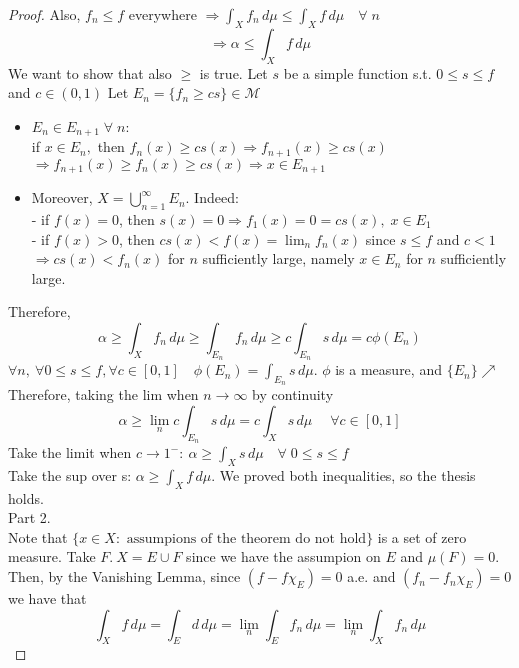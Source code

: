 \begin{proof}
    Also, \(f_n \leq f \) everywhere \(\Rightarrow \int_X f_n \, d\mu \leq \int_X f \, d\mu \quad \forall \; n\) 
    \[
        \Rightarrow \alpha \leq \int_X f \, d\mu 
    \]
    We want to show that also \(\geq \) is true. Let \(s\) be a simple function s.t. \(0 \leq s \leq f\) and \(c \in \left(0,1\right)\)
    Let \(E_n = \{f_n \geq cs\} \in \mathcal{M}\)
    \begin{itemize}
        \item \(E_n \in E_{n+1} \; \forall \; n:\) 
        \\ if \(x \in E_n, \) then \(f_n(x) \geq cs(x) \Rightarrow f_{n+1}(x) \geq cs(x)\) \\ \(\Rightarrow f_{n+1}(x) \geq f_n(x) \geq cs(x) \Rightarrow x \in E_{n+1}\)
        \item Moreover, \(X = \bigcup_{n=1}^\infty E_n\). Indeed: 
        \\ - if \(f(x)=0\), then \(s(x)=0 \Rightarrow f_1(x)=0 = cs(x), \; x \in E_1\) 
        \\ - if \(f(x)>0\), then \(cs(x) < f(x)=\lim_n f_n(x)\) since \(s \leq f \) and \(c <1\) 
        \\ \(\Rightarrow cs(x) < f_n(x)\) for \(n \) sufficiently large, namely \(x \in E_n \) for \(n \) sufficiently large. 
    \end{itemize} 
    Therefore, 
    \[
        \alpha \geq \int_X f_n \, d\mu \geq \int_{E_n} f_n \, d\mu \geq c \int_{E_n} s \, d\mu = c \phi(E_n)
    \]
    \(\forall n, \ \forall 0 \leq s \leq f, \forall c \in \left[0, 1\right]\quad \phi(E_n) = \int_{E_n} s \, d\mu\). 
    \(\phi\) is a measure, and \(\{E_n\} \nearrow\) \\
    Therefore, taking the lim when \(n \to \infty\) by continuity 
    \[
        \alpha \geq \lim_n c \int_{E_n} s \, d\mu = c \int_X s \, d\mu \; \quad \forall c \in \left[0, 1\right]
    \]
    Take the limit when \(c \to 1^-: \ \alpha \geq \int_X s \, d\mu  \quad \forall \; 0 \leq s \leq f \) \\
    Take the sup over s: \(\alpha \geq \int_X f \, d\mu \).
    We proved both inequalities, so the thesis holds. \\
    Part 2. \\
    Note that \(\{x \in X: \text{ assumpions of the theorem do not hold}\}\) is a set of zero measure. Take \(F. \ X = E \cup F \) since we have the assumpion on \(E\) and \(\mu (F)=0\). \\ 
    Then, by the Vanishing Lemma, since \((f - f \chi_E)=0\) a.e. and \((f_n - f_n \chi_E)=0\) we have that 
    \[ 
        \int_X f \, d\mu = \int_E d \, d\mu = \lim_n \int_E f_n \, d\mu = \lim_n \int_X f_n \, d\mu 
    \]
\end{proof}